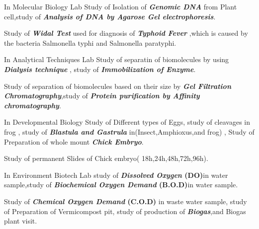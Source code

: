 \documentclass[]{kajalverse-resume}
\begin{document}
\begin{minipage}[t]{0.66\textwidth}
\begin{tightemize}
\item In Molecular Biology Lab Study of Isolation of\textbf{\textit{ Genomic DNA }}from Plant cell,study of\textbf{\textit{ Analysis of DNA by Agarose Gel electrophoresis}}. 
\item Study of\textbf{\textit{ Widal Test}} used for diagnosis of\textbf{\textit{ Typhoid Fever}} ,which is caused by the bacteria Salmonella typhi and Salmonella paratyphi.
\item \textbf{} In Analytical Techniques Lab Study of separatin of biomolecules by using\textbf{\textit{ Dialysis technique}} , study of \textbf{\textit{Immobilization of Enzyme}}.
\item Study of separation of biomolecules based on their size by \textbf{\textit{  Gel Filtration Chromatography}},study of \textbf{\textit {Protein purification by Affinity chromatography}}.
\end{tightemize}

\begin{tightemize}
\item In Developmental Biology Study of Different types of Eggs, study of cleavages in frog , study of\textbf{ \textit{  Blastula and Gastrula }}in(Insect,Amphioxus,and frog) 
% 
, Study of Preparation of whole mount\textbf{\textit{ Chick Embryo}}. \textbf{} 
\item Study of permanent Slides of Chick embryo( 18h,24h,48h,72h,96h).
\end{tightemize}

\begin{tightemize}
\item In Environment Biotech Lab study of\textbf{\textit{ Dissolved Oxygen} (DO)}in water sample,study of \textbf{\textit{Biochemical Oxygen Demand} (B.O.D)}in water sample.
\item Study of \textbf{\textit{Chemical Oxygen Demand} (C.O.D)} in waste water sample, study of Preparation of Vermicompost pit, study of production of \textbf{\textit{Biogas}},and Biogas plant visit.
\end{tightemize}


\end{minipage}
\end{document}
